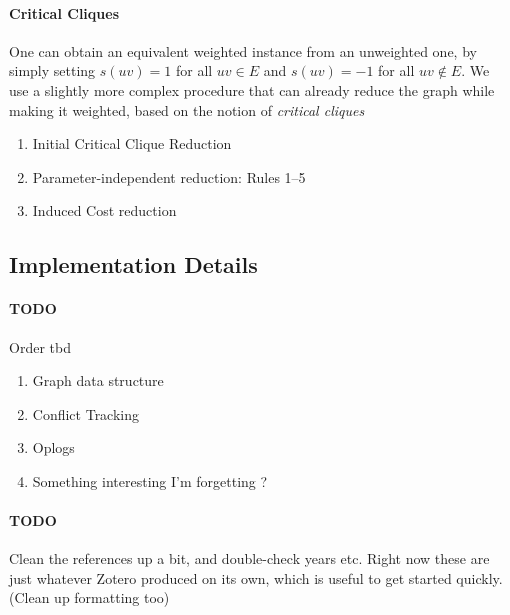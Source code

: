 \documentclass{article}
\newcommand{\todo}[1]{\paragraph{TODO} #1}
\begin{document}
\paragraph{Critical Cliques} One can obtain an equivalent weighted instance from an unweighted one,
by simply setting $s(uv) = 1$ for all $uv \in E$ and $s(uv) = -1$ for all $uv \notin E$. We use a
slightly more complex procedure that can already reduce the graph while making it weighted, based on
the notion of \emph{critical cliques} 


\begin{enumerate}
	\item Initial Critical Clique Reduction
	\item Parameter-independent reduction: Rules 1--5
	\item Induced Cost reduction
\end{enumerate}

\subsection{Implementation Details}

\todo Order tbd
\begin{enumerate}
	\item Graph data structure
	\item Conflict Tracking
	\item Oplogs
	\item Something interesting I'm forgetting ?
\end{enumerate}

\todo Clean the references up a bit, and double-check years etc. Right now these are just whatever
Zotero produced on its own, which is useful to get started quickly. (Clean up formatting too)
\end{document}
